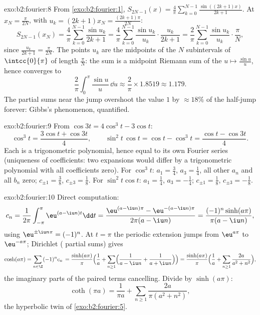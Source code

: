 \begin{solution}{exo:b2:fourier:8}
From \cref{exo:b2:fourier:1}, $S_{2N-1}(x) =
\frac4\pi\sum_{k=0}^{N-1}\frac{\sin((2k+1)x)}{2k+1}$. At $x_N =
\frac{\pi}{2N}$, with $u_k = (2k+1)x_N = \frac{(2k+1)\pi}{2N}$:
\[
S_{2N-1}(x_N) = \frac{4}{\pi}\sum_{k=0}^{N-1}\frac{\sin u_k}{2k+1}
= \frac{4}{\pi}\sum_{k=0}^{N-1}\frac{\sin u_k}{u_k}\cdot
\frac{u_k}{2k+1}
= \frac{2}{\pi}\sum_{k=0}^{N-1}\frac{\sin u_k}{u_k}\cdot
\frac{\pi}{N},
\]
since $\frac{u_k}{2k+1} = \frac{\pi}{2N}$. The points $u_k$ are the
midpoints of the $N$ subintervals of $\intcc{0}{\pi}$ of length
$\frac{\pi}{N}$: the sum is a midpoint Riemann sum of the
 $u \mapsto \frac{\sin u}{u}$, hence converges to
\[
\frac{2}{\pi}\int_0^\pi \frac{\sin u}{u}\,\dd u
\approx \frac{2}{\pi}\times 1.8519 \approx 1.179 .
\]
The partial sums near the jump overshoot the value $1$ by $\approx
18\%$ of the half-jump forever: Gibbs's phenomenon, quantified.
\end{solution}

\begin{solution}{exo:b2:fourier:9}
From $\cos 3t = 4\cos^3t - 3\cos t$:
\[
\cos^3 t = \frac{3\cos t + \cos 3t}{4},
\qquad
\sin^2t\,\cos t = \cos t - \cos^3 t
= \frac{\cos t - \cos 3t}{4} .
\]
Each is a trigonometric polynomial, hence equal to its own
Fourier series (uniqueness of coefficients: two expansions
would differ by a trigonometric polynomial with all
coefficients zero). For $\cos^3t$: $a_1 = \frac34$, $a_3 =
\frac14$, all other $a_n$ and all $b_n$ zero; $c_{\pm1} =
\frac38$, $c_{\pm3} = \frac18$. For $\sin^2t\cos t$: $a_1 =
\frac14$, $a_3 = -\frac14$; $c_{\pm1} = \frac18$, $c_{\pm3} =
-\frac18$.
\end{solution}

\begin{solution}{exo:b2:fourier:10}
Direct computation:
\[
c_n = \frac{1}{2\pi}\int_{-\pi}^{\pi}\eu^{(a - \iu n)t}\dd t
= \frac{\eu^{(a-\iu n)\pi} - \eu^{-(a - \iu n)\pi}}
{2\pi(a - \iu n)}
= \frac{(-1)^n\sinh(a\pi)}{\pi(a - \iu n)} ,
\]
using $\eu^{\pm\iu n\pi} = (-1)^n$. At $t = \pi$ the periodic
extension jumps from $\eu^{a\pi}$ to $\eu^{-a\pi}$; Dirichlet
( partial sums) gives
\[
\cosh(a\pi) = \sum_{n\in\Z}(-1)^n c_n\,
= \frac{\sinh(a\pi)}{\pi}\Bigl(\frac1a +
\sum_{n\geq1}\Bigl(\frac{1}{a - \iu n} +
\frac{1}{a + \iu n}\Bigr)\Bigr)
= \frac{\sinh(a\pi)}{\pi}\Bigl(\frac1a +
\sum_{n\geq1}\frac{2a}{a^2 + n^2}\Bigr) ,
\]
the imaginary parts of the paired terms cancelling. Divide by
$\sinh(a\pi)$:
\[
\coth(\pi a) = \frac{1}{\pi a} +
\sum_{n\geq1}\frac{2a}{\pi(a^2 + n^2)} ,
\]
the hyperbolic twin of \cref{exo:b2:fourier:5}.
\end{solution}

